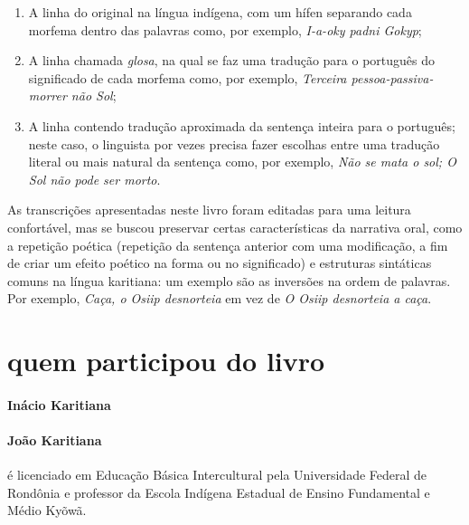 \begin{enumerate}
\item A linha do original na língua indígena, com um hífen separando cada morfema dentro das palavras como, por exemplo, \textit{I-a-oky padni Gokyp};
\item A linha chamada \textit{glosa}, na qual se faz uma tradução para o português do significado de cada morfema como, por exemplo, \textit{Terceira pessoa-passiva-morrer não Sol};
\item A linha contendo tradução aproximada da sentença inteira para o português; neste caso, o linguista por vezes precisa fazer escolhas entre uma tradução literal ou mais natural da sentença como, por exemplo, \textit{Não se mata o sol; O Sol não pode ser morto}. 
\end{enumerate}

As transcrições apresentadas neste livro foram editadas para uma leitura confortável, mas se buscou preservar certas características da narrativa oral, como a repetição poética (repetição da sentença anterior com uma modificação, a fim de criar um efeito poético na forma ou no significado) e estruturas sintáticas comuns na língua karitiana: um exemplo são as inversões na ordem de palavras. Por exemplo, \textit{Caça, o Osiip desnorteia} em vez de \textit{O Osiip desnorteia a caça}.

\section{quem participou do livro\protect\footnotemark}

\paragraph{Inácio Karitiana} 
\vspace{-0.2cm}

\paragraph{João Karitiana} é licenciado em Educação Básica Intercultural pela Universidade Federal de Rondônia e professor da Escola Indígena Estadual de Ensino Fundamental e Médio Kyõwã.
\vspace{-0.2cm}

